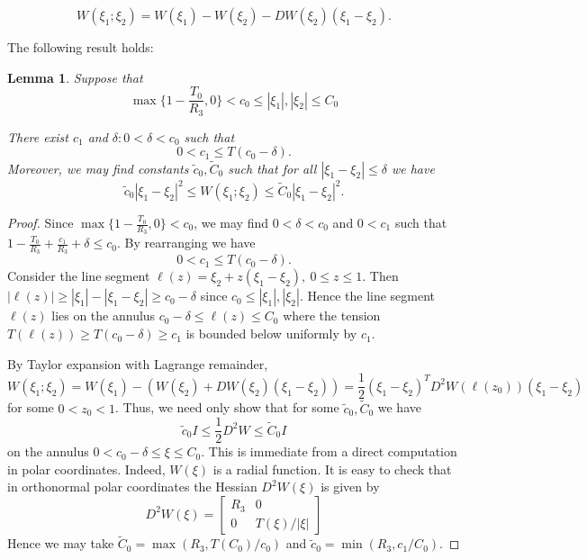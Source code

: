 \documentclass{article}[12pt]
\theoremstyle{Theorem}
\newtheorem{lemma}{Lemma}
\begin{document}
\begin{equation}
    W(\xi_1;\xi_2) = W(\xi_1) - W(\xi_2) - DW(\xi_2)(\xi_1 -\xi_2).
\end{equation}

The following result holds:
\begin{lemma}
    Suppose that \begin{equation}
    \max\{1-\frac{T_0}{R_3},0\}< c_0 \leq |\xi_1|,|\xi_2| \leq C_0
    \end{equation}
    
    There exist $c_1$ and $\delta: 0<\delta<c_0$ such that 
    $$ 0 <c_1 \leq T(c_0 -\delta).$$
    Moreover, we may find constants $\tilde{c}_0, \tilde{C}_0$ such that for all $|\xi_1 - \xi_2|\leq\delta$ we have 
    \begin{equation}
        \tilde{c}_0|\xi_1 - \xi_2|^2 \leq W(\xi_1;\xi_2) \leq  \tilde{C}_0|\xi_1 - \xi_2|^2.
        \label{stretching energy asymptotics}
    \end{equation}
    \label{hessian lemma}
\end{lemma}
\begin{proof}
    Since $\max\{1-\frac{T_0}{R_3},0\} < c_0$, we may find $0 <\delta < c_0$ and $0 <c_1$ such that $1-\frac{T_0}{R_3} +\frac{c_1}{R_3} +\delta \leq c_0$. By rearranging we have $$0 < c_1 \leq T(c_0-\delta).$$ Consider the line segment $\ell(z) = \xi_2 + z(\xi_1 -\xi_2),\ 0\leq z \leq 1$. Then $|\ell(z)| \geq |\xi_1| - |\xi_1 - \xi_2| \geq c_0 - \delta$ since $c_0 \leq |\xi_1|,|\xi_2|$. Hence the line segment $\ell(z)$ lies on the annulus $c_0-\delta \leq \ell(z) \leq C_0$ where the tension $T(\ell(z))\geq T(c_0-\delta)\geq c_1$ is bounded below uniformly by $c_1$.
    \newline
    
    By Taylor expansion with Lagrange remainder, $$W(\xi_1;\xi_2) = W(\xi_1) - (W(\xi_2) + DW(\xi_2)(\xi_1 -\xi_2)) = \frac{1}{2}(\xi_1 - \xi_2)^TD^2W(\ell(z_0))(\xi_1 - \xi_2)$$ for some $0 < z_0 < 1$. Thus, we need only show that for some $\tilde{c}_0,\tilde{C}_0$ we have 
    \begin{equation}
        \tilde{c}_0 I \leq \frac{1}{2}D^2W \leq \tilde{C}_0 I
    \end{equation}
    on the annulus $0 <c_0 -\delta\leq \xi \leq C_0$. This is immediate from a direct computation in polar coordinates. Indeed, $W(\xi)$ is a radial function. It is easy to check that in orthonormal polar coordinates the Hessian $D^2W(\xi)$ is given by 
    \begin{equation}
        D^2W(\xi) = \begin{bmatrix} 
        R_3 & 0 \\
        0 & T(\xi)/|\xi|
        \end{bmatrix}
    \end{equation}
    Hence we may take $\tilde{C}_0 = \max(R_3, T(C_0)/c_0)$ and $\tilde{c}_0 = \min(R_3,c_1/C_0)$.
\end{proof}
\end{document}
